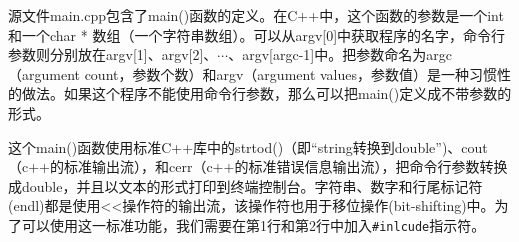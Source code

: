 \documentclass[11pt,oneside]{book}
\begin{document}
\begin{common-format}
源文件main.cpp包含了main()函数的定义。在C++中，这个函数的参数是一个int和一个char * 数组（一个字符串数组）。可以从argv[0]中获取程序的名字，命令行参数则分别放在argv[1]、argv[2]、$\cdots$、argv[argc-1]中。把参数命名为argc（argument count，参数个数）和argv（argument values，参数值）是一种习惯性的做法。如果这个程序不能使用命令行参数，那么可以把main()定义成不带参数的形式。
 
 这个main()函数使用标准C++库中的strtod()（即“string转换到double”)、cout（c++的标准输出流），和cerr（c++的标准错误信息输出流），把命令行参数转换成double，并且以文本的形式打印到终端控制台。字符串、数字和行尾标记符(endl)都是使用<<操作符的输出流，该操作符也用于移位操作(bit-shifting)中。为了可以使用这一标准功能，我们需要在第1行和第2行中加入\verb+#inlcude+指示符。




\end{common-format}
\end{document}
